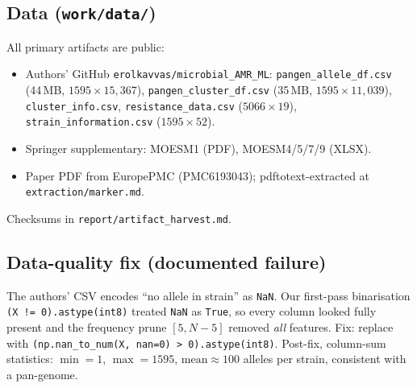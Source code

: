 \documentclass[11pt,letterpaper]{article}
\begin{document}
\subsection{Data (\texttt{work/data/})}
All primary artifacts are public:
\begin{itemize}
  \item Authors' GitHub \texttt{erolkavvas/microbial\_AMR\_ML}:
        \texttt{pangen\_allele\_df.csv} (44\,MB, \(1595\times15{,}367\)),
        \texttt{pangen\_cluster\_df.csv} (35\,MB, \(1595\times11{,}039\)),
        \texttt{cluster\_info.csv}, \texttt{resistance\_data.csv} (\(5066\times19\)),
        \texttt{strain\_information.csv} (\(1595\times52\)).
  \item Springer supplementary: MOESM1 (PDF), MOESM4/5/7/9 (XLSX).
  \item Paper PDF from EuropePMC (PMC6193043); pdftotext-extracted at
        \texttt{extraction/marker.md}.
\end{itemize}
Checksums in \texttt{report/artifact\_harvest.md}.

\subsection{Data-quality fix (documented failure)}
The authors' CSV encodes ``no allele in strain'' as \verb|NaN|. Our first-pass
binarisation \verb|(X != 0).astype(int8)| treated \verb|NaN| as \verb|True|,
so every column looked fully present and the frequency prune
\([5, N{-}5]\) removed \emph{all} features. Fix: replace with
\verb|(np.nan_to_num(X, nan=0) > 0).astype(int8)|. Post-fix, column-sum
statistics: \(\min=1\), \(\max=1595\), \(\mathrm{mean}\approx 100\) alleles per
strain, consistent with a pan-genome.
\end{document}
